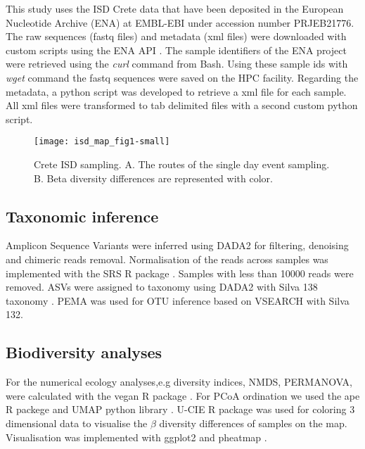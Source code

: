 This study uses the ISD Crete data that have been deposited
in the European Nucleotide Archive (ENA) at EMBL-EBI under accession number PRJEB21776.
The raw sequences (fastq files) and metadata (xml files) were downloaded with custom scripts using the ENA API \parencite{Yuan2023}.
The sample identifiers of the ENA project were retrieved using the \textit{curl} command from Bash. Using these 
sample ids with \textit{wget} command the fastq sequences were saved on the HPC facility. Regarding the metadata, 
a python script was developed to retrieve a xml file for each sample. All xml files
were transformed to tab delimited files with a second custom python script.

\begin{figure}[h] 
    \centering\texttt{[image: isd\_map\_fig1-small]}
    \caption{Crete ISD sampling. A. The routes of the single day event sampling. B. Beta diversity differences are represented with color.}
    \label{fig:isd_crete_sampling}
\end{figure}

\subsection{Taxonomic inference}\label{tax_inference}
Amplicon Sequence Variants were inferred using DADA2 \parencite{Callahan2016} for 
filtering, denoising and chimeric reads removal. Normalisation of the reads
across samples was implemented with the SRS R package \parencite{Beule2020}. Samples
with less than 10000 reads were removed. ASVs were assigned to taxonomy using 
DADA2 with Silva 138 taxonomy \parencite{quast_silva_2013}.
PEMA was used for OTU inference based on VSEARCH \parencite{zafeiropoulos2020pema} with Silva 132.

\subsection{Biodiversity analyses}\label{biodiversity}

For the numerical ecology analyses,e.g diversity indices, NMDS, PERMANOVA, were calculated
with the vegan R package \parencite{oksanen2024vegan}.
For PCoA ordination we used the ape R packege \parencite{Paradis2004} and UMAP python library \parencite{mcinnes2018umap-software}.
U-CIE R package was used for coloring 3 dimensional data \parencite{Koutrouli2022} to 
visualise the $\beta$ diversity differences of samples on the map.
Visualisation was implemented with ggplot2 \parencite{wickham_ggplot2_2016} and pheatmap \parencite{Kolde2019}.

